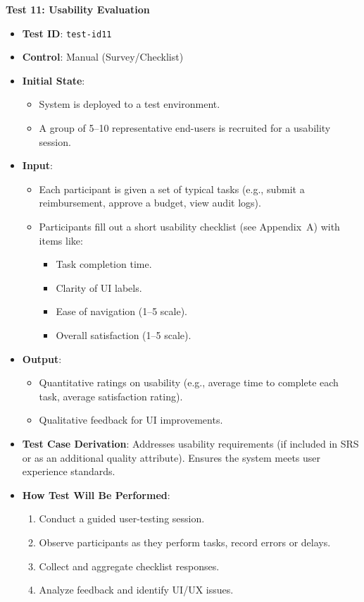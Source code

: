 \documentclass[12pt, titlepage]{article}
\begin{document}
\textbf{Test 11: Usability Evaluation}
\begin{itemize}
    \item \textbf{Test ID}: \texttt{test-id11}
    \item \textbf{Control}: Manual (Survey/Checklist)
    \item \textbf{Initial State}:
    \begin{itemize}
        \item System is deployed to a test environment.
        \item A group of 5--10 representative end-users is recruited for a usability session.
    \end{itemize}
    \item \textbf{Input}:
    \begin{itemize}
        \item Each participant is given a set of typical tasks (e.g., submit a reimbursement, approve a budget, view audit logs).
        \item Participants fill out a short usability checklist (see Appendix~A) with items like:
        \begin{itemize}
            \item Task completion time.
            \item Clarity of UI labels.
            \item Ease of navigation (1--5 scale).
            \item Overall satisfaction (1--5 scale).
        \end{itemize}
    \end{itemize}
    \item \textbf{Output}:
    \begin{itemize}
        \item Quantitative ratings on usability (e.g., average time to complete each task, average satisfaction rating).
        \item Qualitative feedback for UI improvements.
    \end{itemize}
    \item \textbf{Test Case Derivation}:
    Addresses usability requirements (if included in SRS or as an additional quality attribute). Ensures the system meets user experience standards.
    \item \textbf{How Test Will Be Performed}:
    \begin{enumerate}
        \item Conduct a guided user-testing session.
        \item Observe participants as they perform tasks, record errors or delays.
        \item Collect and aggregate checklist responses.
        \item Analyze feedback and identify UI/UX issues.
    \end{enumerate}
\end{itemize}
\end{document}
